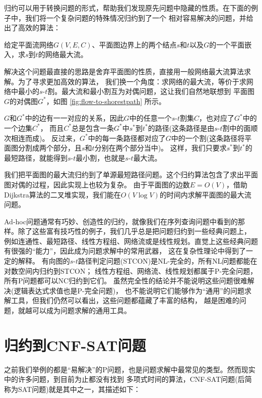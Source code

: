 归约可以用于转换问题的形式，帮助我们发现原先问题中隐藏的性质。在下面的例子中，我们将一个复杂问题的特殊情况归约到了一个
相对容易解决的问题，并给出了高效的算法：

\begin{prob}[平面图最大流]
 给定平面流网络$G(V, E, C)$、平面图边界上的两个结点$s$和$t$以及$G$的一个平面嵌入，求$s$到$t$的网络最大流。
\end{prob}
\begin{solution}
解决这个问题最直接的思路是舍弃平面图的性质，直接用一般网络最大流算法求解。为了寻求更加高效的算法，
我们换一个角度：求网络的最大流，等价于求网络中最小的$s$-$t$割。最大流和最小割互为对偶问题，这让我们自然地联想到
平面图$G$的对偶图$G^*$，如图 \ref{fig:flow-to-shorestpath} 所示。



$G$和$G^*$中的边有一一对应的关系，因此$G$中的任意一个$s$-$t$割集$C$，也对应了$G^*$中的一个边集$C^*$，
而且$C^*$总是包含一条$G^*$中$s^*$到$t^*$的路径(这条路径是由$s$-$t$割中的面顺次相连而成)。
反过来，$G^*$中的每一条路径都对应了$G$中的一个割(这条路径将平面图分割成两个部分，且$s$和$t$分别在两个部分当中)。
这样，我们只要求$s^*$到$t^*$的最短路径，就能得到$s$-$t$最小割，也就是$s$-$t$最大流。

我们把平面图的最大流归约到了单源最短路径问题。这个归约算法包含了求出平面图对偶的过程，因此实现上也较为复杂。
由于平面图的边数$E=O(V)$，借助Dijkstra算法的二叉堆实现，我们能在$O(V\log V)$的时间内求解平面图的最大流问题。
\end{solution}

Ad-hoc问题通常有巧妙、创造性的归约，就像我们在序列查询问题中看到的那样。除了这些富有技巧性的例子，我们几乎总是把问题归约到一些经典问题上，
例如连通性、最短路径、线性方程组、网络流或是线性规划。直觉上这些经典问题有很强的``能力''，因此成为问题求解中的常用武器，
这在复杂性理论中得到了一定的解释。
有向图的$s$-$t$路径判定问题(STCON)是NL-完全的，所有NL问题都能在对数空间内归约到STCON；
线性方程组、网络流、线性规划都属于P-完全问题，所有P问题都可以NC归约到它们。
虽然完全性的结论并不能说明这些问题很难解决(逻辑表达式求值也是P-完全问题)，
也不能说明它们能够作为``通用''的问题求解工具，但我们仍然可以看出，这些问题都蕴藏了丰富的结构，
越是困难的问题，就越可以成为问题求解的通用工具。


\section{归约到CNF-SAT问题}

之前我们举例的都是``易解决''的P问题，也是问题求解中最常见的类型。然而现实中的许多问题，到目前为止都没有找到
多项式时间的算法，CNF-SAT问题(后简称为SAT问题)就是其中之一，其描述如下：

